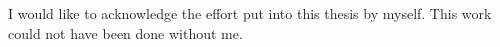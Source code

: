 %
I would like to acknowledge the effort put into this thesis by
myself. This work could not have been done without me.
